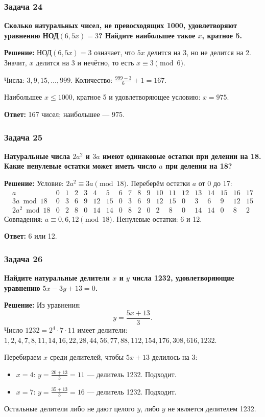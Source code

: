 \documentclass[12pt, a4paper]{article}
\begin{document}
\subsubsection*{Задача 24}
\textbf{Сколько натуральных чисел, не превосходящих 1000, удовлетворяют уравнению НОД$(6, 5x) = 3$? Найдите наибольшее такое $x$, кратное 5.}

\textbf{Решение:}
НОД$(6, 5x) = 3$ означает, что $5x$ делится на 3, но не делится на 2. Значит, $x$ делится на 3 и нечётно, то есть $x \equiv 3 \pmod{6}$.

Числа: $3, 9, 15, \ldots, 999$. Количество: $\frac{999-3}{6} + 1 = 167$.

Наибольшее $x \le 1000$, кратное 5 и удовлетворяющее условию: $x = 975$.

\textbf{Ответ:} 167 чисел; наибольшее — 975.

\subsubsection*{Задача 25}
\textbf{Натуральные числа $2a^2$ и $3a$ имеют одинаковые остатки при делении на 18. Какие ненулевые остатки может иметь число $a$ при делении на 18?}

\textbf{Решение:}
Условие: $2a^2 \equiv 3a \pmod{18}$. Переберём остатки $a$ от 0 до 17:
\[
\begin{array}{c|cccccccccccccccccc}
a & 0 & 1 & 2 & 3 & 4 & 5 & 6 & 7 & 8 & 9 & 10 & 11 & 12 & 13 & 14 & 15 & 16 & 17 \\
\hline
3a \bmod 18 & 0 & 3 & 6 & 9 & 12 & 15 & 0 & 3 & 6 & 9 & 12 & 15 & 0 & 3 & 6 & 9 & 12 & 15 \\
2a^2 \bmod 18 & 0 & 2 & 8 & 0 & 14 & 14 & 0 & 8 & 2 & 0 & 2 & 8 & 0 & 14 & 14 & 0 & 8 & 2
\end{array}
\]
Совпадения: $a \equiv 0, 6, 12 \pmod{18}$. Ненулевые остатки: 6 и 12.

\textbf{Ответ:} 6 или 12.

\subsubsection*{Задача 26}
\textbf{Найдите натуральные делители $x$ и $y$ числа 1232, удовлетворяющие уравнению $5x - 3y + 13 = 0$.}

\textbf{Решение:}
Из уравнения:
\[
y = \frac{5x + 13}{3}.
\]
Число $1232 = 2^4 \cdot 7 \cdot 11$ имеет делители: $1, 2, 4, 7, 8, 11, 14, 16, 22, 28, 44, 56, 77, 88, 112, 154, 176, 308, 616, 1232$.

Перебираем $x$ среди делителей, чтобы $5x+13$ делилось на 3:
\begin{itemize}
    \item $x = 4$: $y = \frac{20+13}{3} = 11$ — делитель 1232. Подходит.
    \item $x = 7$: $y = \frac{35+13}{3} = 16$ — делитель 1232. Подходит.
\end{itemize}
Остальные делители либо не дают целого $y$, либо $y$ не является делителем 1232.
\end{document}
